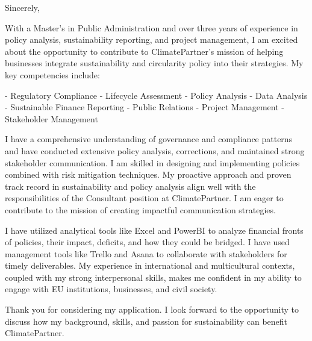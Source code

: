 \documentclass[11pt,a4paper,roman]{moderncv}
\begin{document}
\begin{minipage}[t]{\textwidth}
\end{minipage}

\opening{\vspace*{-2em}}
\closing{Sincerely,}{\vspace*{-2em}}
\makelettertitle

\justifying

With a Master's in Public Administration and over three years of experience in policy analysis, sustainability reporting, and project management, I am excited about the opportunity to contribute to ClimatePartner's mission of helping businesses integrate sustainability and circularity policy into their strategies. My key competencies include:

- Regulatory Compliance
- Lifecycle Assessment
- Policy Analysis
- Data Analysis
- Sustainable Finance Reporting
- Public Relations
- Project Management
- Stakeholder Management

I have a comprehensive understanding of governance and compliance patterns and have conducted extensive policy analysis, corrections, and maintained strong stakeholder communication. I am skilled in designing and implementing policies combined with risk mitigation techniques. My proactive approach and proven track record in sustainability and policy analysis align well with the responsibilities of the Consultant position at ClimatePartner. I am eager to contribute to the mission of creating impactful communication strategies.

I have utilized analytical tools like Excel and PowerBI to analyze financial fronts of policies, their impact, deficits, and how they could be bridged. I have used management tools like Trello and Asana to collaborate with stakeholders for timely deliverables. My experience in international and multicultural contexts, coupled with my strong interpersonal skills, makes me confident in my ability to engage with EU institutions, businesses, and civil society. 

Thank you for considering my application. I look forward to the opportunity to discuss how my background, skills, and passion for sustainability can benefit ClimatePartner.

\vspace{0.5cm}

\makeletterclosing
\end{document}
